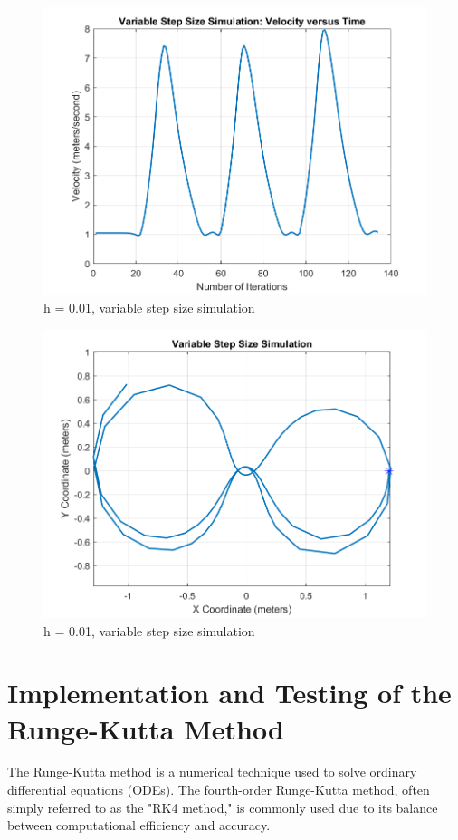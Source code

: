 \documentclass[12pt]{report}
\begin{document}
\begin{figure}
    \centering
    \includegraphics[width = 0.8 \textwidth]{variable (2).png}
    \caption{h = 0.01, variable step size simulation}
\end{figure}
\begin{figure}
    \centering
    \includegraphics[width = 0.8 \textwidth]{variable (3).png}
    \caption{h = 0.01, variable step size simulation}
\end{figure}

\FloatBarrier

\section{Implementation and Testing of the Runge-Kutta Method}

The Runge-Kutta method is a numerical technique used to solve ordinary differential equations (ODEs). The fourth-order Runge-Kutta method, often simply referred to as the "RK4 method," is commonly used due to its balance between computational efficiency and accuracy. 
\end{document}
